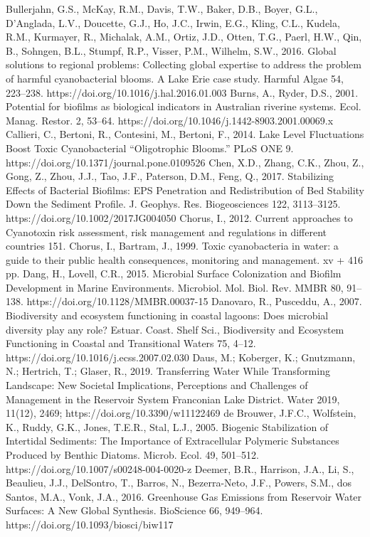 \begin{thebibliography}{}
Bullerjahn, G.S., McKay, R.M., Davis, T.W., Baker, D.B., Boyer, G.L., D’Anglada, L.V., Doucette, G.J., Ho, J.C., Irwin, E.G., Kling, C.L., Kudela, R.M., Kurmayer, R., Michalak, A.M., Ortiz, J.D., Otten, T.G., Paerl, H.W., Qin, B., Sohngen, B.L., Stumpf, R.P., Visser, P.M., Wilhelm, S.W., 2016. Global solutions to regional problems: Collecting global expertise to address the problem of harmful cyanobacterial blooms. A Lake Erie case study. Harmful Algae 54, 223–238. https://doi.org/10.1016/j.hal.2016.01.003
Burns, A., Ryder, D.S., 2001. Potential for biofilms as biological indicators in Australian riverine systems. Ecol. Manag. Restor. 2, 53–64. https://doi.org/10.1046/j.1442-8903.2001.00069.x
Callieri, C., Bertoni, R., Contesini, M., Bertoni, F., 2014. Lake Level Fluctuations Boost Toxic Cyanobacterial “Oligotrophic Blooms.” PLoS ONE 9. https://doi.org/10.1371/journal.pone.0109526
Chen, X.D., Zhang, C.K., Zhou, Z., Gong, Z., Zhou, J.J., Tao, J.F., Paterson, D.M., Feng, Q., 2017. Stabilizing Effects of Bacterial Biofilms: EPS Penetration and Redistribution of Bed Stability Down the Sediment Profile. J. Geophys. Res. Biogeosciences 122, 3113–3125. https://doi.org/10.1002/2017JG004050
Chorus, I., 2012. Current approaches to Cyanotoxin risk assessment, risk management and regulations in different countries 151.
Chorus, I., Bartram, J., 1999. Toxic cyanobacteria in water: a guide to their public health consequences, monitoring and management. xv + 416 pp.
Dang, H., Lovell, C.R., 2015. Microbial Surface Colonization and Biofilm Development in Marine Environments. Microbiol. Mol. Biol. Rev. MMBR 80, 91–138. https://doi.org/10.1128/MMBR.00037-15
Danovaro, R., Pusceddu, A., 2007. Biodiversity and ecosystem functioning in coastal lagoons: Does microbial diversity play any role? Estuar. Coast. Shelf Sci., Biodiversity and Ecosystem Functioning in Coastal and Transitional Waters 75, 4–12. https://doi.org/10.1016/j.ecss.2007.02.030
Daus, M.; Koberger, K.; Gnutzmann, N.; Hertrich, T.; Glaser, R., 2019. Transferring Water While Transforming Landscape: New Societal Implications, Perceptions and Challenges of Management in the Reservoir System Franconian Lake District. Water 2019, 11(12), 2469; https://doi.org/10.3390/w11122469
de Brouwer, J.F.C., Wolfstein, K., Ruddy, G.K., Jones, T.E.R., Stal, L.J., 2005. Biogenic Stabilization of Intertidal Sediments: The Importance of Extracellular Polymeric Substances Produced by Benthic Diatoms. Microb. Ecol. 49, 501–512. https://doi.org/10.1007/s00248-004-0020-z
Deemer, B.R., Harrison, J.A., Li, S., Beaulieu, J.J., DelSontro, T., Barros, N., Bezerra-Neto, J.F., Powers, S.M., dos Santos, M.A., Vonk, J.A., 2016. Greenhouse Gas Emissions from Reservoir Water Surfaces: A New Global Synthesis. BioScience 66, 949–964. https://doi.org/10.1093/biosci/biw117

\end{thebibliography}
